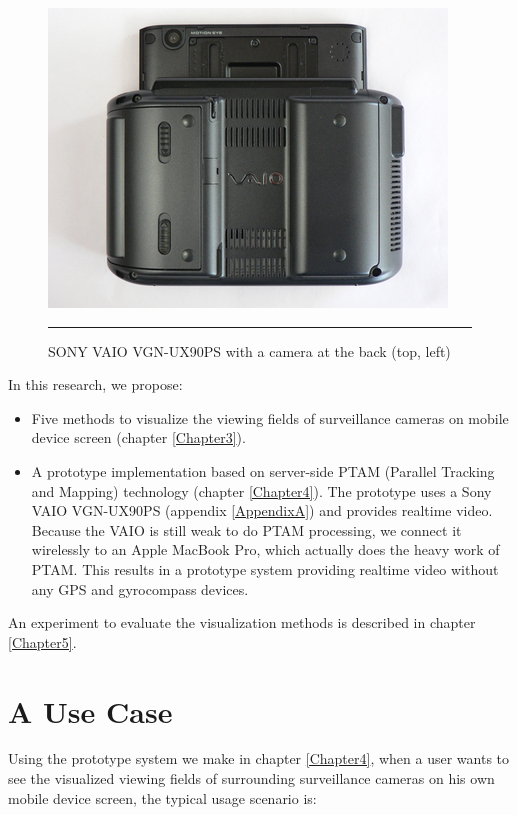 \begin{figure}[htbp]
	\centering
	\includegraphics{./Primitives/vaio_back.jpg}
	\rule{35em}{0.5pt}
	\caption[SONY VAIO VGN-UX90PS with a camera at the back]{SONY VAIO VGN-UX90PS with a camera at the back (top, left)}
	\label{fig:VAIOBack}
\end{figure}

In this research, we propose:
\begin{itemize}
	\item Five methods to visualize the viewing fields of surveillance cameras on mobile device screen (chapter \ref{Chapter3}).
	\item A prototype implementation based on server-side PTAM (Parallel Tracking and Mapping) \citep{Reference12} technology (chapter \ref{Chapter4}). The prototype uses a Sony VAIO VGN-UX90PS (appendix \ref{AppendixA}) and provides realtime video. Because the VAIO is still weak to do PTAM processing, we connect it wirelessly to an Apple MacBook Pro, which actually does the heavy work of PTAM. This results in a prototype system providing realtime video without any GPS and gyrocompass devices.
\end{itemize}

An experiment to evaluate the visualization methods is described in chapter \ref{Chapter5}.

\section{A Use Case}
\label{AUseCase}

Using the prototype system we make in chapter \ref{Chapter4}, when a user wants to see the visualized viewing fields of surrounding surveillance cameras on his own mobile device screen, the typical usage scenario is:

